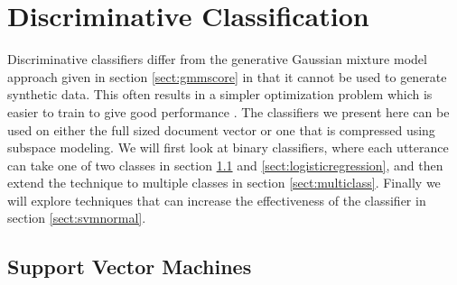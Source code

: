 \chapter{Discriminative Classification}
\label{sect:classify}

Discriminative classifiers differ from the generative Gaussian mixture model approach given in section \ref{sect:gmmscore} in that it cannot be used to generate synthetic data. This often results in a simpler optimization problem which is easier to train to give good performance \cite[p. 204]{machinelearningbook}. The classifiers we present here can be used on either the full sized document vector or one that is compressed using subspace modeling. We will first look at binary classifiers, where each utterance can take one of two classes in section \ref{sect:svm} and \ref{sect:logisticregression}, and then extend the technique to multiple classes in section \ref{sect:multiclass}. Finally we will explore techniques that can increase the effectiveness of the classifier in section \ref{sect:svmnormal}.

\section{Support Vector Machines}
\label{sect:svm}

